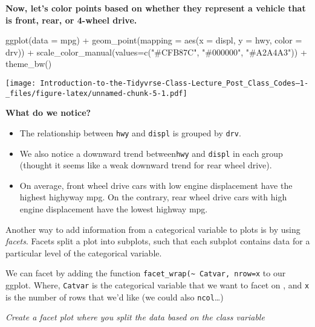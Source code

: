 \documentclass[
]{article}
\newenvironment{Shaded}{\begin{snugshade}}{\end{snugshade}}
\newcommand{\AttributeTok}[1]{\textcolor[rgb]{0.77,0.63,0.00}{#1}}
\newcommand{\FunctionTok}[1]{\textcolor[rgb]{0.00,0.00,0.00}{#1}}
\newcommand{\NormalTok}[1]{#1}
\newcommand{\SpecialCharTok}[1]{\textcolor[rgb]{0.00,0.00,0.00}{#1}}
\newcommand{\StringTok}[1]{\textcolor[rgb]{0.31,0.60,0.02}{#1}}
\begin{document}
\textbf{Now, let's color points based on whether they represent a
vehicle that is front, rear, or 4-wheel drive.}

\begin{Shaded}
\begin{Highlighting}[]
\FunctionTok{ggplot}\NormalTok{(}\AttributeTok{data =}\NormalTok{ mpg) }\SpecialCharTok{+} 
  \FunctionTok{geom\_point}\NormalTok{(}\AttributeTok{mapping =} \FunctionTok{aes}\NormalTok{(}\AttributeTok{x =}\NormalTok{ displ, }\AttributeTok{y =}\NormalTok{ hwy, }\AttributeTok{color =}\NormalTok{ drv)) }\SpecialCharTok{+}
      \FunctionTok{scale\_color\_manual}\NormalTok{(}\AttributeTok{values=}\FunctionTok{c}\NormalTok{(}\StringTok{"\#CFB87C"}\NormalTok{, }\StringTok{"\#000000"}\NormalTok{, }\StringTok{"\#A2A4A3"}\NormalTok{)) }\SpecialCharTok{+}
 \FunctionTok{theme\_bw}\NormalTok{()}
\end{Highlighting}
\end{Shaded}

\texttt{[image: Introduction-to-the-Tidyvrse-Class-Lecture\_Post\_Class\_Codes--1-\_files/figure-latex/unnamed-chunk-5-1.pdf]}

\textbf{What do we notice?}

\begin{itemize}
\item
  The relationship between \texttt{hwy} and \texttt{displ} is grouped by
  \texttt{drv}.
\item
  We also notice a downward trend between\texttt{hwy} and \texttt{displ}
  in each group (thought it seems like a weak downward trend for rear
  wheel drive).
\item
  On average, front wheel drive cars with low engine displacement have
  the highest highyway mpg. On the contrary, rear wheel drive cars with
  high engine displacement have the lowest highway mpg.
\end{itemize}

Another way to add information from a categorical variable to plots is
by using \emph{facets}. Facets split a plot into subplots, such that
each subplot contains data for a particular level of the categorical
variable.

We can facet by adding the function
\texttt{facet\_wrap(\textasciitilde{}\ Catvar,\ nrow=x} to our ggplot.
Where, \texttt{Catvar} is the categorical variable that we want to facet
on , and \texttt{x} is the number of rows that we'd like (we could also
\texttt{ncol}\ldots)

\emph{Create a facet plot where you split the data based on the class
variable}
\end{document}
